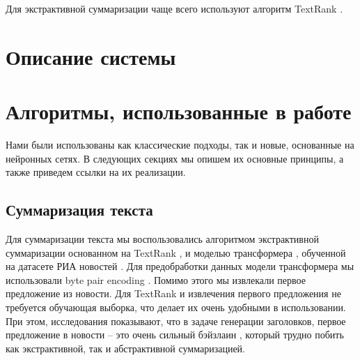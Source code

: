 \documentclass[aps,%
12pt,%
final,%
oneside,
onecolumn,%
musixtex, %
superscriptaddress,%
centertags]{article} %
\begin{document}
Для экстрактивной суммаризации чаще всего используют алгоритм TextRank \cite{TextrankOriginal}.



\section{Описание системы}

\section{Алгоритмы, использованные в работе}
Нами были использованы как классические подходы, так и новые, основанные на нейронных сетях.
В следующих секциях мы опишем их основные принципы, а также приведем ссылки на их реализации.

\subsection{Суммаризация текста}
Для суммаризации текста мы воспользовались алгоритмом экстрактивной суммаризации
основанном на TextRank \cite{DBLP:journals/corr/BarriosLAW16, rehurek_lrec, TextrankOriginal},
и моделью трансформера \cite{DBLP:journals/corr/VaswaniSPUJGKP17}, обученной на
датасете РИА новостей \cite{gavrilov2018self}.
Для предобработки данных модели трансформера мы использовали byte
pair encoding \cite{DBLP:journals/corr/SennrichHB15}.
Помимо этого мы извлекали первое предложение из новости.
Для TextRank и извлечения первого предложения не требуется обучающая выборка, что
делает их очень удобными в использовании. При этом, исследования показывают, что
в задаче генерации заголовков, первое предложение в новости --
это очень сильный бэйзлаин \cite{gavrilov2018self},
который трудно побить как экстрактивной, так и абстрактивной суммаризацией.
\end{document}
